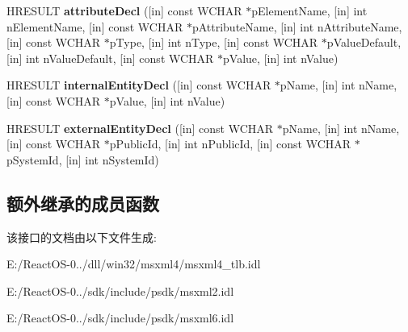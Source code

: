\begin{DoxyCompactItemize}
H\+R\+E\+S\+U\+LT {\bfseries attribute\+Decl} (\mbox{[}in\mbox{]} const W\+C\+H\+AR $\ast$p\+Element\+Name, \mbox{[}in\mbox{]} int n\+Element\+Name, \mbox{[}in\mbox{]} const W\+C\+H\+AR $\ast$p\+Attribute\+Name, \mbox{[}in\mbox{]} int n\+Attribute\+Name, \mbox{[}in\mbox{]} const W\+C\+H\+AR $\ast$p\+Type, \mbox{[}in\mbox{]} int n\+Type, \mbox{[}in\mbox{]} const W\+C\+H\+AR $\ast$p\+Value\+Default, \mbox{[}in\mbox{]} int n\+Value\+Default, \mbox{[}in\mbox{]} const W\+C\+H\+AR $\ast$p\+Value, \mbox{[}in\mbox{]} int n\+Value)
\item 
\mbox{\label{interface_m_s_x_m_l2_1_1_i_s_a_x_decl_handler_a9ced085aa221826fda98e637e74dbab9}} 
H\+R\+E\+S\+U\+LT {\bfseries internal\+Entity\+Decl} (\mbox{[}in\mbox{]} const W\+C\+H\+AR $\ast$p\+Name, \mbox{[}in\mbox{]} int n\+Name, \mbox{[}in\mbox{]} const W\+C\+H\+AR $\ast$p\+Value, \mbox{[}in\mbox{]} int n\+Value)
\item 
\mbox{\label{interface_m_s_x_m_l2_1_1_i_s_a_x_decl_handler_a509bf7c25a580f3df2dd02fd59583dff}} 
H\+R\+E\+S\+U\+LT {\bfseries external\+Entity\+Decl} (\mbox{[}in\mbox{]} const W\+C\+H\+AR $\ast$p\+Name, \mbox{[}in\mbox{]} int n\+Name, \mbox{[}in\mbox{]} const W\+C\+H\+AR $\ast$p\+Public\+Id, \mbox{[}in\mbox{]} int n\+Public\+Id, \mbox{[}in\mbox{]} const W\+C\+H\+AR $\ast$p\+System\+Id, \mbox{[}in\mbox{]} int n\+System\+Id)
\end{DoxyCompactItemize}
\subsection*{额外继承的成员函数}


该接口的文档由以下文件生成\+:\begin{DoxyCompactItemize}
\item 
E\+:/\+React\+O\+S-\/0../dll/win32/msxml4/msxml4\+\_\+tlb.\+idl\item 
E\+:/\+React\+O\+S-\/0../sdk/include/psdk/msxml2.\+idl\item 
E\+:/\+React\+O\+S-\/0../sdk/include/psdk/msxml6.\+idl\end{DoxyCompactItemize}
